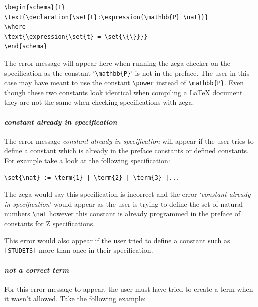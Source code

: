 \begin{exam}
\begin{verbatim}       
\begin{schema}{T}
\text{\declaration{\set{t}:\expression{\mathbb{P} \nat}}}
\where
\text{\expression{\set{t} = \set{\{\}}}}
\end{schema}
\end{verbatim}
\end{exam}

The error message will appear here when running the \gls{zcga} checker on the specification as the constant `\verb|\mathbb{P}|' is not in the preface. The user in this case may have meant to use the constant \verb|\power| instead of \verb|\mathbb{P}|. Even though these two constants look identical when compiling a \LaTeX{} document they are not the same when checking specifications with \gls{zcga}.

\paragraph{\emph{constant already in specification}}

The error message \emph{constant already in specification} will appear if the user tries to define a constant which is already in the preface constants or defined constants. For example take a look at the following specification:

\begin{exam}
\begin{verbatim}
\set{\nat} := \term{1} | \term{2} | \term{3} |...
\end{verbatim}
\end{exam}

The \gls{zcga} would say this specification is incorrect and the error `\emph{constant already in specification}' would appear as the user is trying to define the set of natural numbers \verb|\nat| however this constant is already programmed in the preface of constants for Z specifications.

This error would also appear if the user tried to define a constant such as \verb|[STUDETS]| more  than once in their specification.

\paragraph{\emph{not a correct term}}

For this error message to appear, the user must have tried to create a term when it wasn't allowed. Take the following example:

